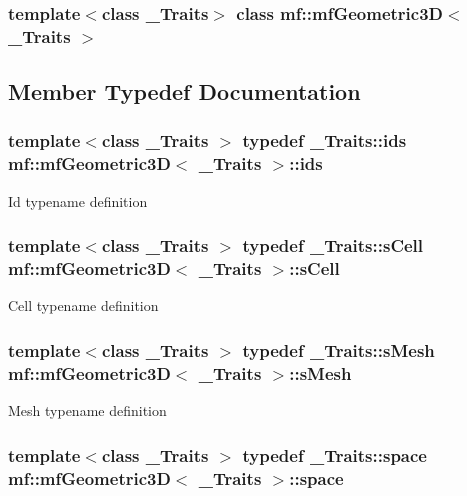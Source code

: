 \subsubsection*{template$<$class \_\-Traits$>$ class mf::mfGeometric3D$<$ \_\-Traits $>$}



\subsection{Member Typedef Documentation}
\hypertarget{classmf_1_1mfGeometric3D_a72458e2b6c0f4da54ce1498e93ccf7db}{
\subsubsection[{ids}]{\setlength{\rightskip}{0pt plus 5cm}template$<$class \_\-Traits $>$ typedef \_\-Traits::ids {\bf mf::mfGeometric3D}$<$ \_\-Traits $>$::{\bf ids}}}
\label{classmf_1_1mfGeometric3D_a72458e2b6c0f4da54ce1498e93ccf7db}
Id typename definition \hypertarget{classmf_1_1mfGeometric3D_a79853aff11a39a8fbbdc9c1a1bee5d6c}{
\subsubsection[{sCell}]{\setlength{\rightskip}{0pt plus 5cm}template$<$class \_\-Traits $>$ typedef \_\-Traits::sCell {\bf mf::mfGeometric3D}$<$ \_\-Traits $>$::{\bf sCell}}}
\label{classmf_1_1mfGeometric3D_a79853aff11a39a8fbbdc9c1a1bee5d6c}
Cell typename definition \hypertarget{classmf_1_1mfGeometric3D_a4eea019f02b26eb572858d3d2f5e04f2}{
\subsubsection[{sMesh}]{\setlength{\rightskip}{0pt plus 5cm}template$<$class \_\-Traits $>$ typedef \_\-Traits::sMesh {\bf mf::mfGeometric3D}$<$ \_\-Traits $>$::{\bf sMesh}}}
\label{classmf_1_1mfGeometric3D_a4eea019f02b26eb572858d3d2f5e04f2}
Mesh typename definition \hypertarget{classmf_1_1mfGeometric3D_ab732339c6fcfe15c8448a3e85409472d}{
\subsubsection[{space}]{\setlength{\rightskip}{0pt plus 5cm}template$<$class \_\-Traits $>$ typedef \_\-Traits::space {\bf mf::mfGeometric3D}$<$ \_\-Traits $>$::{\bf space}}}
